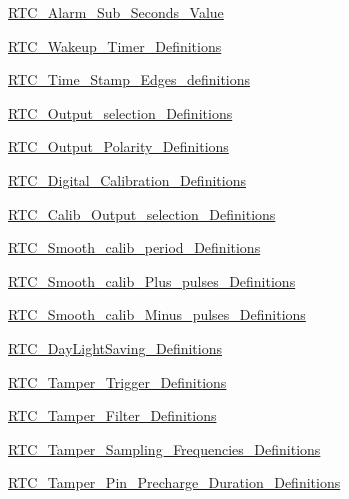 \begin{DoxyCompactItemize}
\hyperlink{group___r_t_c___alarm___sub___seconds___value}{R\-T\-C\-\_\-\-Alarm\-\_\-\-Sub\-\_\-\-Seconds\-\_\-\-Value}
\item 
\hyperlink{group___r_t_c___wakeup___timer___definitions}{R\-T\-C\-\_\-\-Wakeup\-\_\-\-Timer\-\_\-\-Definitions}
\item 
\hyperlink{group___r_t_c___time___stamp___edges__definitions}{R\-T\-C\-\_\-\-Time\-\_\-\-Stamp\-\_\-\-Edges\-\_\-definitions}
\item 
\hyperlink{group___r_t_c___output__selection___definitions}{R\-T\-C\-\_\-\-Output\-\_\-selection\-\_\-\-Definitions}
\item 
\hyperlink{group___r_t_c___output___polarity___definitions}{R\-T\-C\-\_\-\-Output\-\_\-\-Polarity\-\_\-\-Definitions}
\item 
\hyperlink{group___r_t_c___digital___calibration___definitions}{R\-T\-C\-\_\-\-Digital\-\_\-\-Calibration\-\_\-\-Definitions}
\item 
\hyperlink{group___r_t_c___calib___output__selection___definitions}{R\-T\-C\-\_\-\-Calib\-\_\-\-Output\-\_\-selection\-\_\-\-Definitions}
\item 
\hyperlink{group___r_t_c___smooth__calib__period___definitions}{R\-T\-C\-\_\-\-Smooth\-\_\-calib\-\_\-period\-\_\-\-Definitions}
\item 
\hyperlink{group___r_t_c___smooth__calib___plus__pulses___definitions}{R\-T\-C\-\_\-\-Smooth\-\_\-calib\-\_\-\-Plus\-\_\-pulses\-\_\-\-Definitions}
\item 
\hyperlink{group___r_t_c___smooth__calib___minus__pulses___definitions}{R\-T\-C\-\_\-\-Smooth\-\_\-calib\-\_\-\-Minus\-\_\-pulses\-\_\-\-Definitions}
\item 
\hyperlink{group___r_t_c___day_light_saving___definitions}{R\-T\-C\-\_\-\-Day\-Light\-Saving\-\_\-\-Definitions}
\item 
\hyperlink{group___r_t_c___tamper___trigger___definitions}{R\-T\-C\-\_\-\-Tamper\-\_\-\-Trigger\-\_\-\-Definitions}
\item 
\hyperlink{group___r_t_c___tamper___filter___definitions}{R\-T\-C\-\_\-\-Tamper\-\_\-\-Filter\-\_\-\-Definitions}
\item 
\hyperlink{group___r_t_c___tamper___sampling___frequencies___definitions}{R\-T\-C\-\_\-\-Tamper\-\_\-\-Sampling\-\_\-\-Frequencies\-\_\-\-Definitions}
\item 
\hyperlink{group___r_t_c___tamper___pin___precharge___duration___definitions}{R\-T\-C\-\_\-\-Tamper\-\_\-\-Pin\-\_\-\-Precharge\-\_\-\-Duration\-\_\-\-Definitions}
\item 

\end{DoxyCompactItemize}

